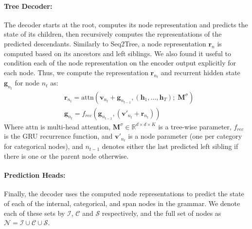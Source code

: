 \paragraph{Tree Decoder: } The decoder starts at the root, computes its node representation and predicts the state of its children, then recursively computes the representations of the predicted descendants. Similarly to Seq2Tree, a node representation $\mathbf{r}_n$ is computed based on its ancestors and left siblings. We also found it useful to condition each of the node representation on the encoder output explicitly for each node. Thus, we compute the representation $\mathbf{r}_{n_t}$ and recurrent hidden state $\mathbf{g}_{n_t}$ for node $n_t$ as:
\begin{align}
& \mathbf{r}_{n_t} = \text{attn}(\mathbf{v}_{n_t} + \mathbf{g}_{n_{t-1}}, (\mathbf{h}_1,\ldots, \mathbf{h}_T); \; \textbf{M}^\sigma) \\
& \mathbf{g}_{n_{t}} =
    f_{rec}(\mathbf{g}_{n_{t-1}}, (\mathbf{v'}_{n_t} + \mathbf{r}_{n_t}))
\end{align}
Where  $\text{attn}$ is multi-head attention, $\textbf{M}^{\sigma} \in \mathbb{R}^{d \times d \times K}$ is a tree-wise parameter, $f_{rec}$ is the GRU recurrence function, and $\mathbf{v'}_{n_t}$ is a node parameter (one per category for categorical nodes), and $n_{t-1}$ denotes either the last predicted left sibling if there is one or the parent node otherwise.

\paragraph{Prediction Heads: } Finally, the decoder uses the computed node representations to predict the state of each of the internal, categorical, and span nodes in the grammar. We denote each of these sets by $\mathcal{I}$, $\mathcal{C}$ and $\mathcal{S}$ respectively, and the full set of nodes as $\mathcal{N} = \mathcal{I} \cup \mathcal{C} \cup \mathcal{S}$.

